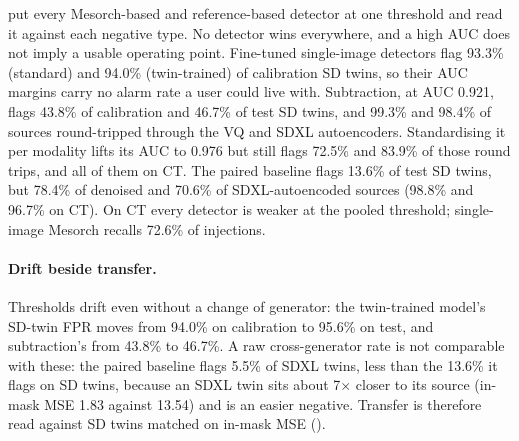  put every Mesorch-based and reference-based detector at one threshold and read it against each negative type.
No detector wins everywhere, and a high AUC does not imply a usable operating point.
Fine-tuned single-image detectors flag 93.3\% (standard) and 94.0\% (twin-trained) of calibration SD twins, %
so their AUC margins carry no alarm rate a user could live with.
Subtraction, at AUC 0.921, flags 43.8\% of calibration and 46.7\% of test SD twins, %
and 99.3\% and 98.4\% of sources round-tripped through the VQ and SDXL autoencoders. %
Standardising it per modality lifts its AUC to 0.976 %
but still flags 72.5\% and 83.9\% of those round trips, %
and all of them on CT.
The paired baseline flags 13.6\% of test SD twins, %
but 78.4\% of denoised and 70.6\% of SDXL-autoencoded sources (98.8\% and 96.7\% on CT). %
On CT every detector is weaker at the pooled threshold; single-image Mesorch recalls 72.6\% of injections. %

\paragraph{Drift beside transfer.}
Thresholds drift even without a change of generator: the twin-trained model's SD-twin FPR moves from 94.0\% on calibration to 95.6\% on test, and subtraction's from 43.8\% to 46.7\%. %
A raw cross-generator rate is not comparable with these: the paired baseline flags 5.5\% of SDXL twins, less than the 13.6\% it flags on SD twins, %
because an SDXL twin sits about 7$\times$ closer to its source (in-mask MSE 1.83 against 13.54) and is an easier negative. %
Transfer is therefore read against SD twins matched on in-mask MSE ().

